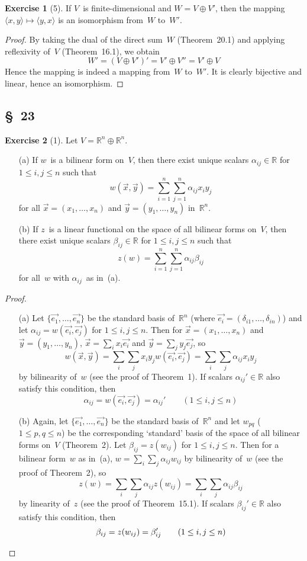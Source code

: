 \documentclass[letterpaper,12pt]{article}
\newcommand{\R}{\mathbb{R}}
\newcommand{\dsum}{\oplus}
\newcommand{\pair}[2]{\langle{#1},{#2}\rangle}
\theoremstyle{definition}
\newtheorem*{exer}{Exercise}
\theoremstyle{remark}
\theoremstyle{direction}
\begin{document}
\begin{exer}[5]
If \(V\)~is finite-dimensional and \(W=V\dsum V'\), then the mapping \(\pair{x}{y}\mapsto\pair{y}{x}\) is an isomorphism from~\(W\) to~\(W'\).
\end{exer}
\begin{proof}
By taking the dual of the direct sum~\(W\) (Theorem~20.1) and applying reflexivity of~\(V\) (Theorem~16.1), we obtain
\[W'=(V\dsum V')'=V'\dsum V''=V'\dsum V\]
Hence the mapping is indeed a mapping from~\(W\) to~\(W'\). It is clearly bijective and linear, hence an isomorphism.
\end{proof}

\subsection*{\S~23}
\begin{exer}[1]
Let \(V=\R^n\dsum\R^n\).
\begin{enumerate}
\item[(a)] If \(w\)~is a bilinear form on~\(V\), then there exist unique scalars \(\alpha_{ij}\in\R\) for \(1\le i,j\le n\) such that
\[w(\vec{x},\vec{y})=\sum_{i=1}^n\sum_{j=1}^n\alpha_{ij}x_iy_j\]
for all \(\vec{x}=(x_1,\ldots,x_n)\) and \(\vec{y}=(y_1,\ldots,y_n)\) in~\(\R^n\).
\item[(b)] If \(z\)~is a linear functional on the space of all bilinear forms on~\(V\), then there exist unique scalars \(\beta_{ij}\in\R\) for \(1\le i,j\le n\) such that
\[z(w)=\sum_{i=1}^n\sum_{j=1}^n\alpha_{ij}\beta_{ij}\]
for all~\(w\) with \(\alpha_{ij}\)~as in~(a).
\end{enumerate}
\end{exer}
\begin{proof}\
\begin{enumerate}
\item[(a)] Let \(\{\vec{e_1},\ldots,\vec{e_n}\}\) be the standard basis of~\(\R^n\) (where \(\vec{e_i}=(\delta_{i1},\ldots,\delta_{in})\)) and let \(\alpha_{ij}=w(\vec{e_i},\vec{e_j})\) for \(1\le i,j\le n\). Then for \(\vec{x}=(x_1,\ldots,x_n)\) and \(\vec{y}=(y_1,\ldots,y_n)\), \(\vec{x}=\sum_i x_i\vec{e_i}\) and \(\vec{y}=\sum_j y_j\vec{e_j}\), so
\[w(\vec{x},\vec{y})=\sum_i\sum_jx_iy_jw(\vec{e_i},\vec{e_j})=\sum_i\sum_j\alpha_{ij}x_iy_j\]
by bilinearity of~\(w\) (see the proof of Theorem~1). If scalars \(\alpha_{ij}'\in\R\) also satisfy this condition, then
\[\alpha_{ij}=w(\vec{e_i},\vec{e_j})=\alpha_{ij}'\qquad(1\le i,j\le n)\]
\item[(b)]
Again, let \(\{\vec{e_1},\ldots,\vec{e_n}\}\) be the standard basis of~\(\R^n\) and let \(w_{pq}\) (\(1\le p,q\le n\)) be the corresponding `standard' basis of the space of all bilinear forms on~\(V\) (Theorem~2). Let \(\beta_{ij}=z(w_{ij})\) for \(1\le i,j\le n\). Then for a bilinear form~\(w\) as in~(a), \(w=\sum_i\sum_j\alpha_{ij}w_{ij}\) by bilinearity of~\(w\) (see the proof of Theorem~2), so
\[z(w)=\sum_i\sum_j\alpha_{ij}z(w_{ij})=\sum_i\sum_j\alpha_{ij}\beta_{ij}\]
by linearity of~\(z\) (see the proof of Theorem~15.1). If scalars \(\beta_{ij}'\in\R\) also satisfy this condition, then
\[\beta_{ij}=z(w_{ij})=\beta_{ij}'\qquad(1\le i,j\le n)\qedhere\]
\end{enumerate}
\end{proof}
\end{document}
